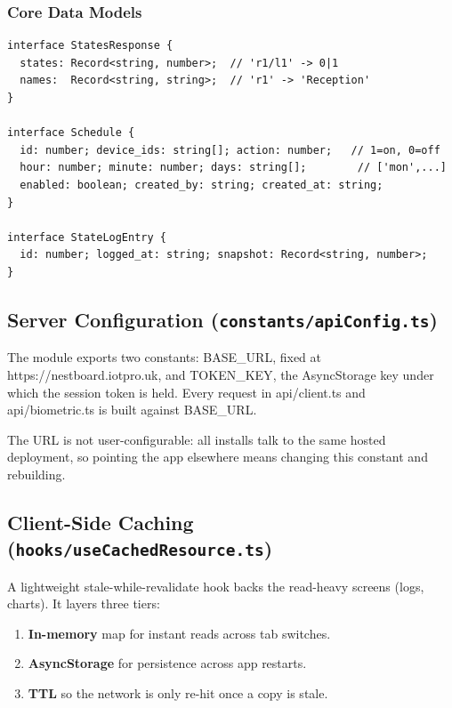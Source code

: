 \documentclass[11pt,a4paper]{article}
\newcommand{\code}[1]{\colorbox{codebg}{\ttfamily\small #1}}
\begin{document}
\subsubsection{Core Data Models}

\begin{lstlisting}[language=tsx]
interface StatesResponse {
  states: Record<string, number>;  // 'r1/l1' -> 0|1
  names:  Record<string, string>;  // 'r1' -> 'Reception'
}

interface Schedule {
  id: number; device_ids: string[]; action: number;   // 1=on, 0=off
  hour: number; minute: number; days: string[];        // ['mon',...]
  enabled: boolean; created_by: string; created_at: string;
}

interface StateLogEntry {
  id: number; logged_at: string; snapshot: Record<string, number>;
}
\end{lstlisting}

\subsection{Server Configuration (\texttt{constants/apiConfig.ts})}
\label{sec:apiconfig}

The module exports two constants: \code{BASE\_URL}, fixed at
\code{https://nestboard.iotpro.uk}, and \code{TOKEN\_KEY}, the AsyncStorage key
under which the session token is held. Every request in \code{api/client.ts} and
\code{api/biometric.ts} is built against \code{BASE\_URL}.

The URL is not user-configurable: all installs talk to the same hosted
deployment, so pointing the app elsewhere means changing this constant and
rebuilding.

\subsection{Client-Side Caching (\texttt{hooks/useCachedResource.ts})}

A lightweight stale-while-revalidate hook backs the read-heavy screens (logs,
charts). It layers three tiers:

\begin{enumerate}[leftmargin=1.5em]
  \item \textbf{In-memory} map for instant reads across tab switches.
  \item \textbf{AsyncStorage} for persistence across app restarts.
  \item \textbf{TTL} so the network is only re-hit once a copy is stale.
\end{enumerate}
\end{document}
